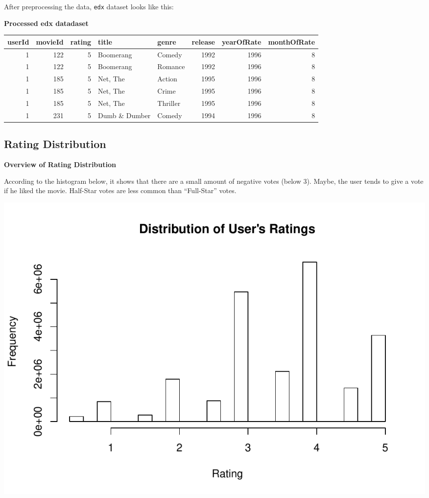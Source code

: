 \documentclass[]{article}
\begin{document}
After preprocessing the data, \texttt{edx} dataset looks like this:

\textbf{Processed edx datadaset}

\begin{table}[H]
\centering\begingroup\fontsize{10}{12}\selectfont

\begin{tabular}{r|r|r|l|l|r|r|r}
\hline
userId & movieId & rating & title & genre & release & yearOfRate & monthOfRate\\
\hline
1 & 122 & 5 & Boomerang & Comedy & 1992 & 1996 & 8\\
\hline
1 & 122 & 5 & Boomerang & Romance & 1992 & 1996 & 8\\
\hline
1 & 185 & 5 & Net, The & Action & 1995 & 1996 & 8\\
\hline
1 & 185 & 5 & Net, The & Crime & 1995 & 1996 & 8\\
\hline
1 & 185 & 5 & Net, The & Thriller & 1995 & 1996 & 8\\
\hline
1 & 231 & 5 & Dumb \& Dumber & Comedy & 1994 & 1996 & 8\\
\hline
\end{tabular}
\endgroup{}
\end{table}

\newpage

\hypertarget{rating-distribution}{%
\subsection{Rating Distribution}\label{rating-distribution}}

\textbf{Overview of Rating Distribution}

According to the histogram below, it shows that there are a small amount
of negative votes (below 3). Maybe, the user tends to give a vote if he
liked the movie. Half-Star votes are less common than ``Full-Star''
votes.

\begin{center}\includegraphics{MovieLens_Project_Report_files/figure-latex/unnamed-chunk-17-1} \end{center}
\end{document}
